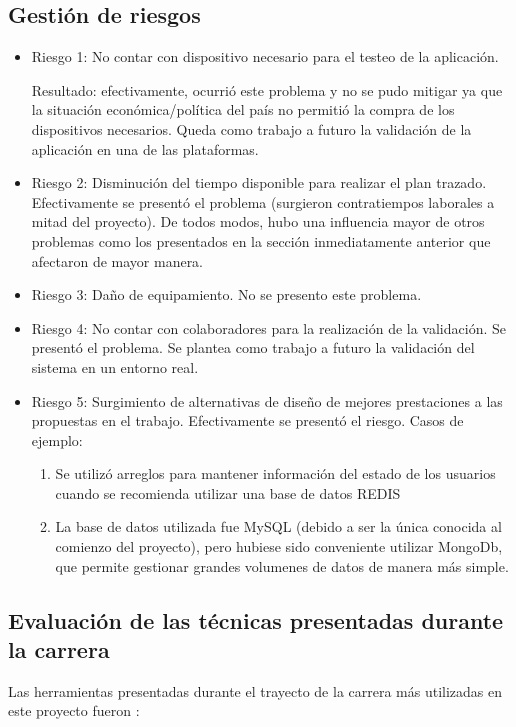 \subsection{Gestión de riesgos}

\begin{itemize}
\item Riesgo 1: No contar con dispositivo necesario para el testeo de la aplicación. 

Resultado: efectivamente, ocurrió este problema y no se pudo mitigar ya que la situación económica/política del país no permitió la compra de los dispositivos necesarios. Queda como trabajo a futuro la validación de la aplicación en una de las plataformas.
\item Riesgo 2: Disminución del tiempo disponible para realizar el plan trazado.
Efectivamente se presentó el problema (surgieron contratiempos laborales a mitad del proyecto). De todos modos, hubo una influencia mayor de otros problemas como los presentados en la sección inmediatamente anterior que afectaron de mayor manera.
\item Riesgo 3: Daño de equipamiento.
No se presento este problema.
\item Riesgo 4: No contar con colaboradores para la realización de la validación.
Se presentó el problema. Se plantea como trabajo a futuro la validación del sistema en un entorno real.
\item Riesgo 5: Surgimiento de alternativas de diseño de mejores prestaciones a las propuestas en el trabajo.
Efectivamente se presentó el riesgo. Casos de ejemplo:
\begin{enumerate}
\item Se utilizó arreglos para mantener información del estado de los usuarios cuando se recomienda utilizar una base de datos REDIS
\item La base de datos utilizada fue MySQL (debido a ser la única conocida al comienzo del proyecto), pero hubiese sido conveniente utilizar MongoDb, que permite gestionar grandes volumenes de datos de manera más simple.
\end{enumerate}
\end{itemize}


\subsection{Evaluación de las técnicas presentadas durante la carrera}

Las herramientas presentadas durante el trayecto de la carrera más utilizadas en este proyecto fueron :

